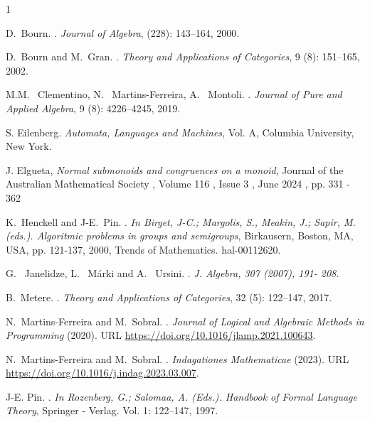 \documentclass[12pt]{article}
\begin{document}
\begin{thebibliography}{1}

D.~Bourn.
.
\newblock \emph{Journal of Algebra},  (228): 143--164, 2000.

D.~Bourn and M.~Gran.
.
\newblock \emph{Theory and Applications of Categories}, 9 (8): 151--165, 2002.

M.M. ~Clementino, N. ~Martins-Ferreira, A. ~Montoli.
.
\newblock \emph{Journal of Pure and Applied Algebra}, 9 (8): 4226--4245, 2019.

 S. Eilenberg.
\newblock \emph {\em Automata, Languages and Machines}, Vol. A, Columbia University, New York.

 J. Elgueta, \emph{Normal submonoids and congruences on a monoid}, 
Journal of the Australian Mathematical Society , Volume 116 , Issue 3 , June 2024 , pp. 331 - 362

K.~Henckell and J-E.~Pin.
.
\newblock \emph {In Birget, J-C.; Margolis, S., Meakin, J.; Sapir, M. (eds.). Algoritmic problems in groups and semigroups}, Birkausern, Boston, MA, USA, pp. 121-137, 2000, Trends of Mathematics. hal-00112620.

G. ~Janelidze, L. ~M\'{a}rki and A. ~Ursini.
.
\newblock \emph {J. Algebra, 307 (2007), 191- 208.}

B.~Metere.
.
\newblock \emph{Theory and Applications of Categories}, 32 (5): 122--147, 2017.


N.~Martins-Ferreira and M.~Sobral.
.
\newblock \emph{Journal of Logical and Algebraic Methods in Programming} (2020).
\newblock URL \url{https://doi.org/10.1016/jlamp.2021.100643}.


N.~Martins-Ferreira and M.~Sobral.
.
\newblock \emph{Indagationes Mathematicae} (2023).
\newblock URL \url{https://doi.org/10.1016/j.indag.2023.03.007}.

 J-E. Pin.
 .
\newblock \emph{In Rozenberg, G.; Salomaa, A. (Eds.). Handbook of Formal Language Theory}, Springer - Verlag. Vol. 1: 122--147, 1997.


\end{thebibliography}
\newpage 
\end{document}
